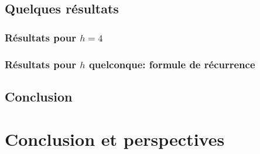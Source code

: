 \documentclass[12pt]{memoireuqam1.3}
\begin{document}
\section{Quelques résultats}
\subsection{Résultats pour $h=4$}
\subsection{Résultats pour $h$ quelconque: formule de récurrence }
\section*{Conclusion}
\chapter{Conclusion et perspectives}
\renewcommand \bibname{R\'EF\'ERENCES}%

\renewcommand \listfigurename{LISTE DES FIGURES}
\renewcommand \appendixname{APPENDICE}
\renewcommand \figurename{Figure}
\renewcommand \tablename{Tableau}

\addtocounter{page}{1} %

\tableofcontents %
\listoftables %
\listoffigures %















\end{document}
